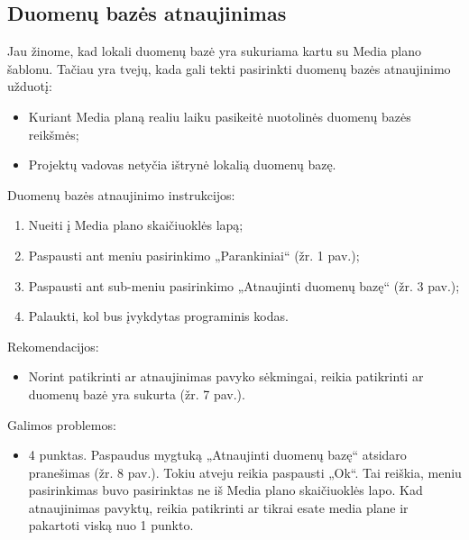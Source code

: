 \subsection{Duomenų bazės atnaujinimas}
Jau žinome, kad lokali duomenų bazė yra sukuriama kartu su Media plano šablonu. Tačiau yra tvejų, kada gali tekti pasirinkti duomenų bazės atnaujinimo užduotį:
\begin{itemize}
    \itemsep0em 
    \item Kuriant Media planą realiu laiku pasikeitė nuotolinės duomenų bazės reikšmės;
    \item Projektų vadovas netyčia ištrynė lokalią duomenų bazę.
\end{itemize}

\bigskip
Duomenų bazės atnaujinimo instrukcijos: 
\begin{enumerate}
    \itemsep0em 
    \item Nueiti į Media plano skaičiuoklės lapą;
    \item Paspausti ant meniu pasirinkimo „Parankiniai“ (žr. 1 pav.);
    \item Paspausti ant sub-meniu pasirinkimo „Atnaujinti duomenų bazę“ (žr. 3 pav.);
    \item Palaukti, kol bus įvykdytas programinis kodas. 
\end{enumerate}

\bigskip
Rekomendacijos:
\begin{itemize}
    \itemsep0em 
    \item Norint patikrinti ar atnaujinimas pavyko sėkmingai, reikia patikrinti ar duomenų bazė yra sukurta (žr. 7 pav.).
\end{itemize}

\bigskip
Galimos problemos:
\begin{itemize}
    \itemsep0em 
    \item 4 punktas. Paspaudus mygtuką „Atnaujinti duomenų bazę“ atsidaro pranešimas (žr. 8 pav.). Tokiu atveju reikia paspausti „Ok“. Tai reiškia, meniu pasirinkimas buvo pasirinktas ne iš Media plano skaičiuoklės lapo. Kad atnaujinimas pavyktų, reikia patikrinti ar tikrai esate media plane ir pakartoti viską nuo 1 punkto. 
\end{itemize}

